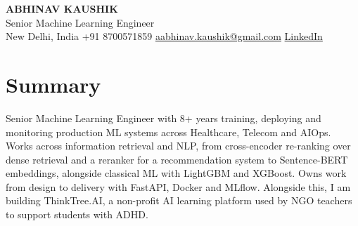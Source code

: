 \documentclass[10pt,a4paper]{article}
\begin{document}
\begin{center}
  {\LARGE\bfseries ABHINAV KAUSHIK}\\[2pt]
  {\large Senior Machine Learning Engineer}\\[2pt]
  New Delhi, India \textbar{} +91 8700571859 \textbar{} \href{mailto:aabhinav.kaushik@gmail.com}{aabhinav.kaushik@gmail.com} \textbar{} \href{https://www.linkedin.com/in/abhinav-kaushik10/}{LinkedIn}  
\end{center}

\section{Summary}
Senior Machine Learning Engineer with 8+ years training, deploying and monitoring production ML systems across Healthcare, Telecom and AIOps. Works across information retrieval and NLP, from cross-encoder re-ranking over dense retrieval and a reranker for a recommendation system to Sentence-BERT embeddings, alongside classical ML with LightGBM and XGBoost. Owns work from design to delivery with FastAPI, Docker and MLflow. Alongside this, I am building ThinkTree.AI, a non-profit AI learning platform used by NGO teachers to support students with ADHD.
\end{document}
